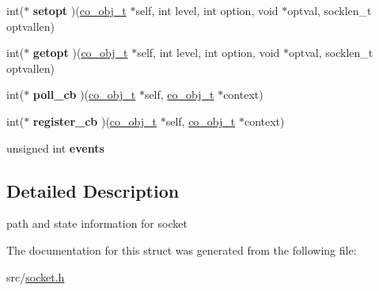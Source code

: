 \begin{DoxyCompactItemize}
\item 
\hypertarget{structco__socket__t_a6d3e7ffe7c26430e415af7e53ed9d2b5}{int($\ast$ {\bfseries setopt} )(\hyperlink{structco__obj__t}{co\-\_\-obj\-\_\-t} $\ast$self, int level, int option, void $\ast$optval, socklen\-\_\-t optvallen)}\label{structco__socket__t_a6d3e7ffe7c26430e415af7e53ed9d2b5}

\item 
\hypertarget{structco__socket__t_a8f68b33d5c7223001459499961ccc8d5}{int($\ast$ {\bfseries getopt} )(\hyperlink{structco__obj__t}{co\-\_\-obj\-\_\-t} $\ast$self, int level, int option, void $\ast$optval, socklen\-\_\-t optvallen)}\label{structco__socket__t_a8f68b33d5c7223001459499961ccc8d5}

\item 
\hypertarget{structco__socket__t_a5f6df267292124bcb7633b1d2bcdc7d0}{int($\ast$ {\bfseries poll\-\_\-cb} )(\hyperlink{structco__obj__t}{co\-\_\-obj\-\_\-t} $\ast$self, \hyperlink{structco__obj__t}{co\-\_\-obj\-\_\-t} $\ast$context)}\label{structco__socket__t_a5f6df267292124bcb7633b1d2bcdc7d0}

\item 
\hypertarget{structco__socket__t_afd575e9225c7389a58375a52a720c485}{int($\ast$ {\bfseries register\-\_\-cb} )(\hyperlink{structco__obj__t}{co\-\_\-obj\-\_\-t} $\ast$self, \hyperlink{structco__obj__t}{co\-\_\-obj\-\_\-t} $\ast$context)}\label{structco__socket__t_afd575e9225c7389a58375a52a720c485}

\item 
\hypertarget{structco__socket__t_a7da260ad3df14279a2791818ceca0cac}{unsigned int {\bfseries events}}\label{structco__socket__t_a7da260ad3df14279a2791818ceca0cac}

\end{DoxyCompactItemize}


\subsection{Detailed Description}
path and state information for socket 

The documentation for this struct was generated from the following file\-:\begin{DoxyCompactItemize}
\item 
src/\hyperlink{socket_8h}{socket.\-h}\end{DoxyCompactItemize}
